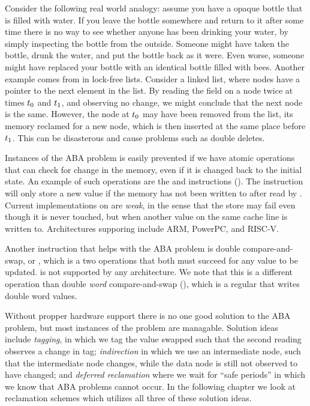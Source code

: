 \documentclass[b5paper]{report}
\begin{document}
Consider the following real world analogy: assume you have a opaque bottle that
is filled with water. If you leave the bottle somewhere and return to it after
some time there is no way to see whether anyone has been drinking your water, by
simply inspecting the bottle from the outside. Someone might have taken the
bottle, drunk the water, and put the bottle back as it were. Even worse, someone
might have replaced your bottle with an identical bottle filled with bees.
Another example comes from in lock-free lists. Consider a linked list, where
nodes have a  pointer to the next element in the list.  By reading
the  field on a node twice at times $t\sb{0}$ and $t\sb{1}$, and
observing no change, we might conclude that the next node is the same. However,
the node at $t\sb{0}$ may have been removed from the list, its memory reclamed
for a new node, which is then inserted at the same place before $t\sb{1}$. This
can be disasterous and cause problems such as double deletes.

Instances of the ABA problem is easily prevented if we have atomic operations
that can check for change in the memory, even if it is changed back to the
initial state. An example of such operations are the  and
 instructions (). The  instruction
will only store a new value if the memory has not been written to after read by
. Current implementations on  are \emph{weak}, in the sense
that the store may fail even though it is never touched, but when another value
on the same cache line is written to. Architectures supporing 
include ARM, PowerPC, and RISC-V.

Another instruction that helps with the ABA problem is double compare-and-swap,
or , which is a two  operations that both must succeed for
any value to be updated.  is not supported by any architecture. We
note that this is a different operation than double \emph{word} compare-and-swap
(), which is a regular  that writes double word values.

Without propper hardware support there is no one good solution to the ABA
problem, but most instances of the problem are managable. Solution ideas include
\emph{tagging}, in which we tag the value swapped such that the second reading
observes a change in tag; \emph{indirection} in which we use an intermediate
node, such that the intermediate node changes, while the data node is still not
observed to have changed; and \emph{deferred reclamation} where we wait for
``safe periods'' in which we know that ABA problems cannot occur. In the
following chapter we look at reclamation schemes which utilizes all three of
these solution ideas.
\end{document}
